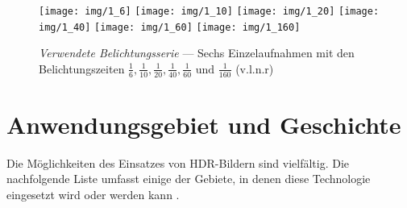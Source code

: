\begin{figure}[H]
  \begin{center}
    \texttt{[image: img/1\_6]}
    \texttt{[image: img/1\_10]}
    \texttt{[image: img/1\_20]}
    \texttt{[image: img/1\_40]}
    \texttt{[image: img/1\_60]}
    \texttt{[image: img/1\_160]}
    \caption{\textit{Verwendete Belichtungsserie} --- Sechs Einzelaufnahmen mit den Belichtungszeiten $\frac{1}{6}, \frac{1}{10}, \frac{1}{20}, \frac{1}{40}, \frac{1}{60}\mbox{ und }\frac{1}{160}$ (v.l.n.r) \cite{tellone}}
    \label{fig:teezer}
  \end{center}
\end{figure}





\section{Anwendungsgebiet und Geschichte}

Die Möglichkeiten des Einsatzes von \gls{HDR}-Bildern sind vielfältig. Die nachfolgende Liste umfasst einige der Gebiete, in denen diese Technologie eingesetzt wird oder werden kann \cite[S.~87f]{Reinhard}.

